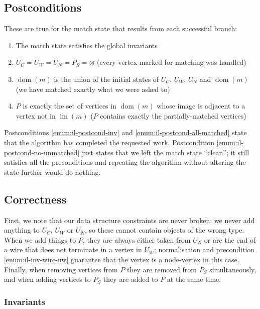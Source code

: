 \documentclass{article}
\DeclareMathOperator{\dom}{dom}
\DeclareMathOperator{\im}{im}
\begin{document}
\subsection{Postconditions}
These are true for the match state that results from each successful branch:
\begin{enumerate}
  \renewcommand{\theenumi}{(\Roman{enumi})}
  \renewcommand{\labelenumi}{\theenumi}
  \item \label{enum:il-postcond-inv} The match state satisfies the global invariants
  \item \label{enum:il-postcond-no-unmatched} $U_C = U_W = U_N = P_S = \varnothing$ (every vertex marked for matching was handled)
  \item \label{enum:il-postcond-all-matched} $\dom(m)$ is the union of the initial states of $U_C$, $U_W$, $U_N$ and $\dom(m)$ (we have matched exactly what we were asked to)
  \item \label{enum:il-postcond-P} $P$ is exactly the set of vertices in $\dom(m)$ whose image is adjacent to a vertex not in $\im(m)$ ($P$ contains exactly the partially-matched vertices)
\end{enumerate}

Postconditions \ref{enum:il-postcond-inv} and \ref{enum:il-postcond-all-matched} state that the algorithm has completed the requested work.  Postcondition \ref{enum:il-postcond-no-unmatched} just states that we left the match state ``clean''; it still satisfies all the preconditions and repeating the algorithm without altering the state further would do nothing.

\subsection{Correctness}

First, we note that our data structure constraints are never broken: we never add anything to $U_C$, $U_W$ or $U_N$, so these cannot contain objects of the wrong type.  When we add things to $P$, they are always either taken from $U_N$ or are the end of a wire that does not terminate in a vertex in $U_W$; normalisation and precondition \ref{enum:il-inv-wire-uw} guarantee that the vertex is a node-vertex in this case.  Finally, when removing vertices from $P$ they are removed from $P_S$ simultaneously, and when adding vertices to $P_S$ they are added to $P$ at the same time.

\subsubsection{Invariants}
\end{document}
